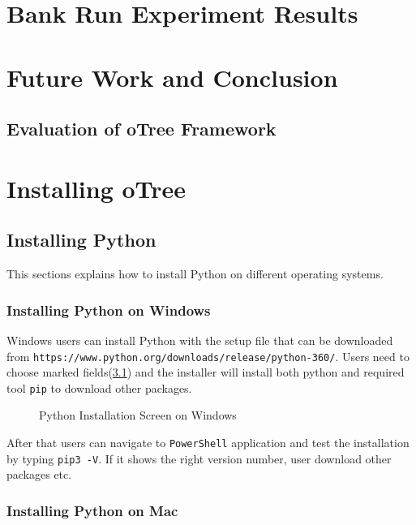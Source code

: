 \chapter{Bank Run Experiment Results} \label{cha:bankrunResults}

\chapter{Future Work and Conclusion}

\section{Evaluation of oTree Framework}

\begin{appendix} \label{anhang}
\chapter{Installing oTree} \label{anhang1}

\section{Installing Python}

This sections explains how to install Python on different operating systems. 

\subsection{Installing Python on Windows}

Windows users can install Python with the setup file that can be downloaded from \verb|https://www.python.org/downloads/release/python-360/|. Users 
need to choose marked fields(\ref{fig:picture1}) and the installer will install both python and required tool \verb|pip| to download other packages.

\begin{figure}[h]
	\centerline{}
	\caption{Python Installation Screen on Windows}
	\label{fig:picture1}
\end{figure}


After that users can navigate to  \verb|PowerShell| application and test the installation by typing  \verb|pip3 -V|. If it shows the right version number, user download other packages etc.


\subsection{Installing Python on Mac}


\end{appendix}
